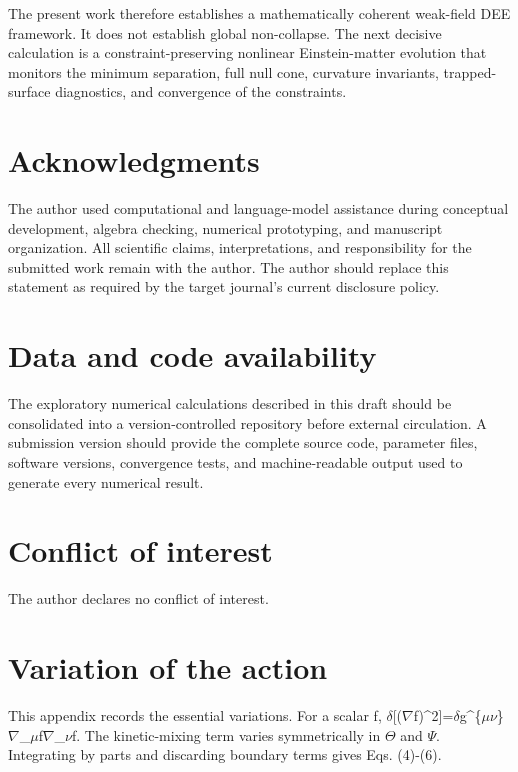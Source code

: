 \documentclass[aps,prd,preprint,nofootinbib,superscriptaddress]{revtex4-2}
\begin{document}
The present work therefore establishes a mathematically coherent weak-field DEE framework. It does not establish global non-collapse. The next decisive calculation is a constraint-preserving nonlinear Einstein-matter evolution that monitors the minimum separation, full null cone, curvature invariants, trapped-surface diagnostics, and convergence of the constraints.


\section{Acknowledgments}

The author used computational and language-model assistance during conceptual development, algebra checking, numerical prototyping, and manuscript organization. All scientific claims, interpretations, and responsibility for the submitted work remain with the author. The author should replace this statement as required by the target journal's current disclosure policy.


\section{Data and code availability}

The exploratory numerical calculations described in this draft should be consolidated into a version-controlled repository before external circulation. A submission version should provide the complete source code, parameter files, software versions, convergence tests, and machine-readable output used to generate every numerical result.


\section{Conflict of interest}

The author declares no conflict of interest.


\appendix

\section{Variation of the action}

This appendix records the essential variations. For a scalar f, $\delta$[($\nabla$f)\textasciicircum{}2]=$\delta$g\textasciicircum{}\{$\mu$$\nu$\}$\nabla$\_$\mu$f$\nabla$\_$\nu$f. The kinetic-mixing term varies symmetrically in $\Theta$ and $\Psi$. Integrating by parts and discarding boundary terms gives Eqs. (4)-(6).
\end{document}
